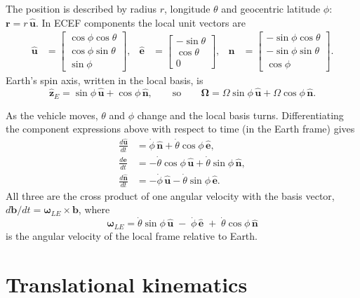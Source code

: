 \documentclass[11pt]{report}
\numberwithin{equation}{chapter}
\newcommand{\uh}{\hat{\mathbf u}}
\newcommand{\eh}{\hat{\mathbf e}}
\newcommand{\nh}{\hat{\mathbf n}}
\newcommand{\zh}{\hat{\mathbf z}_E}
\newcommand{\vb}[1]{\bm{#1}}
\begin{document}
The position is described by radius $r$, longitude $\theta$ and geocentric latitude $\phi$:
$\vb r = r\,\uh$. In ECEF components the local unit vectors are
\begin{align}
  \uh &= \begin{bmatrix} \cos\phi\cos\theta \\ \cos\phi\sin\theta \\ \sin\phi \end{bmatrix},&
  \eh &= \begin{bmatrix} -\sin\theta \\ \cos\theta \\ 0 \end{bmatrix},&
  \nh &= \begin{bmatrix} -\sin\phi\cos\theta \\ -\sin\phi\sin\theta \\ \cos\phi \end{bmatrix}.
\end{align}
Earth's spin axis, written in the local basis, is
\begin{equation}
  \zh = \sin\phi\,\uh + \cos\phi\,\nh,
  \qquad\text{so}\qquad
  \vb\Omega = \Omega\sin\phi\,\uh + \Omega\cos\phi\,\nh .
  \label{eq:omega_local}
\end{equation}

As the vehicle moves, $\theta$ and $\phi$ change and the local basis turns. Differentiating
the component expressions above with respect to time (in the Earth frame) gives
\begin{align}
  \frac{d\uh}{dt} &= \dot\phi\,\nh + \dot\theta\cos\phi\,\eh, \label{eq:duh}\\
  \frac{d\eh}{dt} &= -\dot\theta\cos\phi\,\uh + \dot\theta\sin\phi\,\nh, \\
  \frac{d\nh}{dt} &= -\dot\phi\,\uh - \dot\theta\sin\phi\,\eh .
\end{align}
All three are the cross product of one angular velocity with the basis vector,
$d\vb b/dt = \vb\omega_{LE}\times\vb b$, where
\begin{equation}
  \vb\omega_{LE} = \dot\theta\sin\phi\,\uh \;-\; \dot\phi\,\eh \;+\; \dot\theta\cos\phi\,\nh
  \label{eq:omegaLE}
\end{equation}
is the angular velocity of the local frame relative to Earth.

\section{Translational kinematics}
\end{document}
